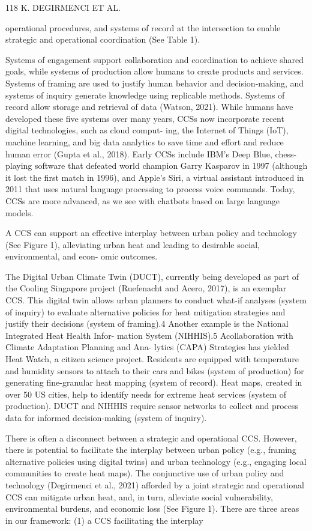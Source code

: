 \documentclass[10pt,a4paper]{article}
\begin{document}
118 K. DEGIRMENCI ET AL.

operational procedures, and systems of record at the intersection to enable strategic and operational coordination (See Table 1).

Systems of engagement support collaboration and coordination to achieve shared goals, while systems of production allow humans to create products and services. Systems of framing are used to justify human behavior and decision-making, and systems of inquiry generate knowledge using replicable methods. Systems of record allow storage and retrieval of data (Watson, 2021). While humans have developed these ﬁve systems over many years, CCSs now incorporate recent digital technologies, such as cloud comput- ing, the Internet of Things (IoT), machine learning, and big data analytics to save time and eﬀort and reduce human error (Gupta et al., 2018). Early CCSs include IBM’s Deep Blue, chess-playing software that defeated world champion Garry Kasparov in 1997 (although it lost the ﬁrst match in 1996), and Apple’s Siri, a virtual assistant introduced in 2011 that uses natural language processing to process voice commands. Today, CCSs are more advanced, as we see with chatbots based on large language models.

A CCS can support an eﬀective interplay between urban policy and technology (See Figure 1), alleviating urban heat and leading to desirable social, environmental, and econ- omic outcomes.

The Digital Urban Climate Twin (DUCT), currently being developed as part of the Cooling Singapore project (Ruefenacht and Acero, 2017), is an exemplar CCS. This digital twin allows urban planners to conduct what-if analyses (system of inquiry) to evaluate alternative policies for heat mitigation strategies and justify their decisions (system of framing).4 Another example is the National Integrated Heat Health Infor- mation System (NIHHIS).5 Acollaboration with Climate Adaptation Planning and Ana- lytics (CAPA) Strategies has yielded Heat Watch, a citizen science project. Residents are equipped with temperature and humidity sensors to attach to their cars and bikes (system of production) for generating ﬁne-granular heat mapping (system of record). Heat maps, created in over 50 US cities, help to identify needs for extreme heat services (system of production). DUCT and NIHHIS require sensor networks to collect and process data for informed decision-making (system of inquiry).

There is often a disconnect between a strategic and operational CCS. However, there is potential to facilitate the interplay between urban policy (e.g., framing alternative policies using digital twins) and urban technology (e.g., engaging local communities to create heat maps). The conjunctive use of urban policy and technology (Degirmenci et al., 2021) aﬀorded by a joint strategic and operational CCS can mitigate urban heat, and, in turn, alleviate social vulnerability, environmental burdens, and economic loss (See Figure 1). There are three areas in our framework: (1) a CCS facilitating the interplay
\end{document}
